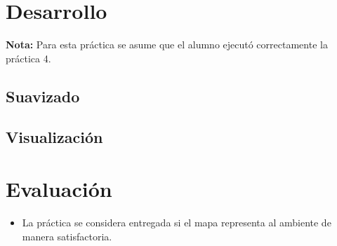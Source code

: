 \documentclass[letterpaper,12pt]{article}
\begin{document}
\section{Desarrollo}
\textbf{Nota:} Para esta práctica se asume que el alumno ejecutó correctamente la práctica 4.


\subsection{Suavizado}
\subsection{Visualización}
\section{Evaluación}
\begin{itemize}
\item La práctica se considera entregada si el mapa representa al ambiente de manera satisfactoria. 
\end{itemize}
\end{document}
